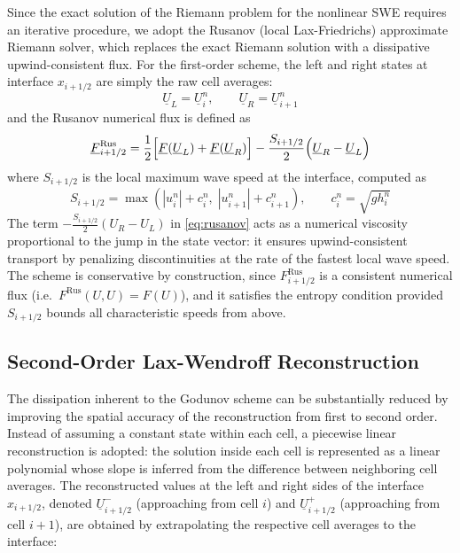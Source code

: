 Since the exact solution of the Riemann problem for the nonlinear SWE requires an 
iterative procedure, we adopt the Rusanov (local Lax-Friedrichs) approximate 
Riemann solver, which replaces the exact Riemann solution with a dissipative 
upwind-consistent flux. For the first-order scheme, the left and right states at 
interface $x_{i+1/2}$ are simply the raw cell averages:
%
\begin{equation}
    \underline{U}_L = \underline{U}_i^n, 
    \qquad \underline{U}_R = \underline{U}_{i+1}^n
\end{equation}
%
and the Rusanov numerical flux is defined as
%
\begin{equation}
    \underline{F}^{\mathrm{Rus}}_{i+1/2} 
    = \frac{1}{2}\Bigl[\underline{F}(\underline{U}_L) 
    + \underline{F}(\underline{U}_R)\Bigr] 
    - \frac{S_{i+1/2}}{2}\Bigl(\underline{U}_R - \underline{U}_L\Bigr)
    \label{eq:rusanov}
\end{equation}
%
where $S_{i+1/2}$ is the local maximum wave speed at the interface, computed as
%
\begin{equation}
    S_{i+1/2} = \max\!\left(|u_i^n| + c_i^n,\; 
    |u_{i+1}^n| + c_{i+1}^n\right),
    \qquad c_i^n = \sqrt{g h_i^n}
    \label{eq:Smax}
\end{equation}
%
The term $-\tfrac{S_{i+1/2}}{2}(U_R - U_L)$ in \eqref{eq:rusanov} acts as a 
numerical viscosity proportional to the jump in the state vector: it ensures 
upwind-consistent transport by penalizing discontinuities at the rate of the 
fastest local wave speed. The scheme is conservative by construction, since 
$F^{\mathrm{Rus}}_{i+1/2}$ is a consistent numerical flux 
(i.e.\ $F^{\mathrm{Rus}}(U,U) = F(U)$), and it satisfies the entropy condition 
provided $S_{i+1/2}$ bounds all characteristic speeds from above.

\subsection{Second-Order Lax-Wendroff Reconstruction}
\label{ssc:314}

The dissipation inherent to the Godunov scheme can be substantially reduced by improving the spatial accuracy of the reconstruction from first to second order. Instead of assuming a constant state within each cell, a piecewise linear reconstruction is adopted: the solution inside each cell is represented as a linear polynomial whose slope is inferred from the difference between neighboring cell averages. The reconstructed values at the left and right sides of the interface \( x_{i+1/2} \), denoted \( \underline{U}_{i+1/2}^{-} \) (approaching from cell \( i \)) and \( \underline{U}_{i+1/2}^{+} \) (approaching from cell \( i+1 \)), are obtained by extrapolating the respective cell averages to the interface:

